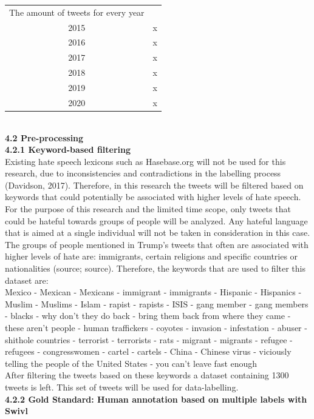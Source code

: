 \documentclass[a4paper,pdf]{article}
\begin{document}
\begin{center}
\begin{tabular}{ c c}
 The amount of tweets for every year &   \\ 
 2015 & x \\  
 2016 & x \\
 2017 & x    \\
 2018 & x    \\
 2019 & x    \\
 2020 & x    \\
\end{tabular}
\end{center} \\

\textbf{4.2 Pre-processing}\\
\break{}
\textbf{4.2.1 Keyword-based filtering}\\
\break{}
Existing hate speech lexicons such as Hasebase.org will not be used for this research, due to inconsistencies and contradictions in the labelling process (Davidson, 2017). Therefore, in this research the tweets will be filtered based on keywords that could potentially be associated with higher levels of hate speech. For the purpose of this research and the limited time scope, only tweets that could be hateful towards groups of people will be analyzed. Any hateful language that is aimed at a single individual will not be taken in consideration in this case. The groups of people mentioned in Trump's tweets that often are associated with higher levels of hate are: immigrants, certain religions and specific countries or nationalities (source; source). Therefore, the keywords that are used to filter this dataset are: \\
\break{}
Mexico - Mexican - Mexicans - immigrant - immigrants - Hispanic - Hispanics - Muslim - Muslims - Islam - rapist - rapists - ISIS - gang member - gang members - blacks - why don’t they do back - bring them back from where they came - these aren’t people - human traffickers - coyotes - invasion -  infestation - abuser - shithole countries - terrorist - terrorists - rats -  migrant - migrants - refugee - refugees - congresswomen - cartel - cartels -  China - Chinese virus - viciously telling the people of the United States -  you can’t leave fast enough \\
\break{}
After filtering the tweets based on these keywords a dataset containing 1300 tweets is left. This set of tweets will be used for data-labelling.\\
\break{}
\textbf{4.2.2 Gold Standard: Human annotation based on multiple labels with Swivl}\\
\end{document}

